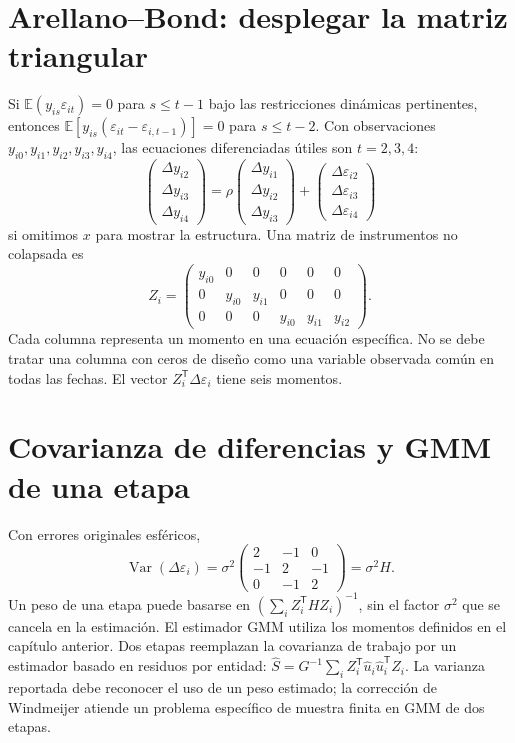 \documentclass[11pt,a4paper]{article}
\newcommand{\E}{\mathbb E}
\newcommand{\T}{^{\mathsf T}}
\DeclareMathOperator{\Var}{Var}
\theoremstyle{definition}
\newcounter{problema}
\newcommand{\eps}{\varepsilon}
\begin{document}
\section{Arellano--Bond: desplegar la matriz triangular}
Si $\E(y_{is}\eps_{it})=0$ para $s\le t-1$ bajo las restricciones dinámicas pertinentes, entonces
$\E[y_{is}(\eps_{it}-\eps_{i,t-1})]=0$ para $s\le t-2$.
Con observaciones $y_{i0},y_{i1},y_{i2},y_{i3},y_{i4}$, las ecuaciones diferenciadas útiles son $t=2,3,4$:
\[
\begin{pmatrix}\Delta y_{i2}\\\Delta y_{i3}\\\Delta y_{i4}\end{pmatrix}
=\rho\begin{pmatrix}\Delta y_{i1}\\\Delta y_{i2}\\\Delta y_{i3}\end{pmatrix}
+\begin{pmatrix}\Delta\eps_{i2}\\\Delta\eps_{i3}\\\Delta\eps_{i4}\end{pmatrix}
\]
si omitimos $x$ para mostrar la estructura.
Una matriz de instrumentos no colapsada es
\[
Z_i=\begin{pmatrix}
y_{i0}&0&0&0&0&0\\
0&y_{i0}&y_{i1}&0&0&0\\
0&0&0&y_{i0}&y_{i1}&y_{i2}
\end{pmatrix}.
\]
Cada columna representa un momento en una ecuación específica.
No se debe tratar una columna con ceros de diseño como una variable observada común en todas las fechas.
El vector $Z_i\T\Delta\eps_i$ tiene seis momentos.

\section{Covarianza de diferencias y GMM de una etapa}
Con errores originales esféricos,
\[
\Var(\Delta\eps_i)=\sigma^2
\begin{pmatrix}
2&-1&0\\-1&2&-1\\0&-1&2
\end{pmatrix}
=\sigma^2H.
\]
Un peso de una etapa puede basarse en
$(\sum_iZ_i\T HZ_i)^{-1}$, sin el factor $\sigma^2$ que se cancela en la estimación.
El estimador GMM utiliza los momentos definidos en el capítulo anterior.
Dos etapas reemplazan la covarianza de trabajo por un estimador basado en residuos por entidad:
$\widehat S=G^{-1}\sum_iZ_i\T\widehat u_i\widehat u_i\T Z_i$.
La varianza reportada debe reconocer el uso de un peso estimado; la corrección de Windmeijer atiende un problema específico de muestra finita en GMM de dos etapas.
\end{document}
